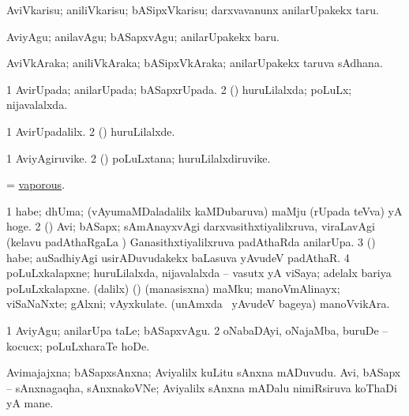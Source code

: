 \bentry
{} 
\gl{\sakirx}
\expl{}
\bmng
 AviVkarisu; aniliVkarisu; bASipxVkarisu; darxvavanunx anilarUpakekx taru. 
\emng

\noindent 
\gl{\akirx}
\expl{}
\bmng
 AviyAgu; anilavAgu; bASapxvAgu; anilarUpakekx baru. 
\emng
\eentry

\bentry
{} 
\gl{\nA}
\expl{}
\bmng
 AviVkAraka; aniliVkAraka; bASipxVkAraka; anilarUpakekx taruva sAdhana. 
\emng
\eentry

\bentry
{} 
\gl{\gu}
\expl{}
\bmng
\bnum
\num{1} AvirUpada; anilarUpada; bASapxrUpada. 
\num{2} (\rUpa) huruLilalxda; poLuLx; nijavalalxda. 
\enum
\emng
\eentry

\bentry
{} 
\gl{\kirxvi}
\expl{}
\bmng
\bnum
\num{1} AvirUpadalilx. 
\num{2} (\rUpa) huruLilalxde. 
\enum
\emng
\eentry

\bentry
{} 
\gl{\nA}
\expl{}
\bmng
\bnum
\num{1} AviyAgiruvike. 
\num{2} (\rUpa) poLuLxtana; huruLilalxdiruvike. 
\enum
\emng
\eentry

\bentry
{} 
\gl{\gu}
\expl{}
\bmng
 = \hyperlink{vaporous}{vaporous}. 
\emng
\eentry

\bentry 
{} 
\gl{\nA}
\bmng
\bnum
\num{1} habe; dhUma; (vAyumaMDaladalilx kaMDubaruva) maMju (rUpada teVva) yA hoge. 
\num{2} (\Bwvi) Avi; bASapx; sAmAnayxvAgi darxvasithxtiyalilxruva, viraLavAgi (kelavu padAthaRgaLa \vi) Ganasithxtiyalilxruva padAthaRda anilarUpa. 
\num{3} (\veYshA) habe; auSadhiyAgi usirADuvudakekx baLasuva yAvudeV padAthaR. 
\num{4} poLuLxkalapxne; huruLilalxda, nijavalalxda -- vasutx yA viSaya;  adelalx bariya poLuLxkalapxne. 
 (\bava dalilx) (\pArxparx) 
\banum
{} (manasisxna) maMku; manoVmAlinayx; viSaNaNxte; gAlxni; vAyxkulate. 
 (unAmxda \mo\ yAvudeV bageya) manoVvikAra. 
\eanum
\numie
\enum
\emng
\eentry

\bentry
{} 
\gl{\akirx}
\expl{}
\bmng
\bnum
\num{1} AviyAgu; anilarUpa taLe; bASapxvAgu. 
\num{2} oNabaDAyi, oNajaMba, buruDe -- kocucx; poLuLxharaTe hoDe. 
\enum
\emng
\eentry

\bentry
{}
\gl{\nA}
\expl{}
\bmng
\banum
{} Avimajajxna; bASapxsAnxna; Aviyalilx kuLitu sAnxna mADuvudu. 
 Avi, bASapx -- sAnxnagaqha, sAnxnakoVNe; Aviyalilx sAnxna mADalu nimiRsiruva koThaDi yA mane. 
\eanum
\emng
\eentry

